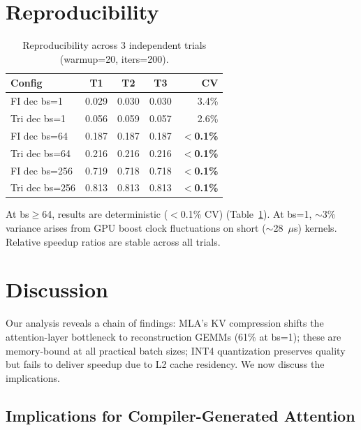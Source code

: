 \documentclass[10pt,twocolumn]{article}
\begin{document}
\section{Reproducibility}
\label{sec:repro}

\begin{table}[h]
\centering
\small
\caption{Reproducibility across 3 independent trials (warmup=20, iters=200).}
\label{tab:repro}
\begin{tabular}{@{}lcccr@{}}
\toprule
Config & T1 & T2 & T3 & CV \\
\midrule
FI dec bs=1   & 0.029 & 0.030 & 0.030 & 3.4\% \\
Tri dec bs=1  & 0.056 & 0.059 & 0.057 & 2.6\% \\
FI dec bs=64  & 0.187 & 0.187 & 0.187 & \textbf{$<$0.1\%} \\
Tri dec bs=64 & 0.216 & 0.216 & 0.216 & \textbf{$<$0.1\%} \\
FI dec bs=256 & 0.719 & 0.718 & 0.718 & \textbf{$<$0.1\%} \\
Tri dec bs=256& 0.813 & 0.813 & 0.813 & \textbf{$<$0.1\%} \\
\bottomrule
\end{tabular}
\end{table}

At bs$\geq$64, results are deterministic ($<$0.1\% CV) (Table~\ref{tab:repro}).  At bs=1, $\sim$3\% variance arises from GPU boost clock fluctuations on short ($\sim$28~$\mu$s) kernels.  Relative speedup ratios are stable across all trials.

\section{Discussion}

Our analysis reveals a chain of findings: MLA's KV compression shifts the attention-layer bottleneck to reconstruction GEMMs (61\% at bs=1); these are memory-bound at all practical batch sizes; INT4 quantization preserves quality but fails to deliver speedup due to L2 cache residency.  We now discuss the implications.

\subsection{Implications for Compiler-Generated Attention}
\end{document}
